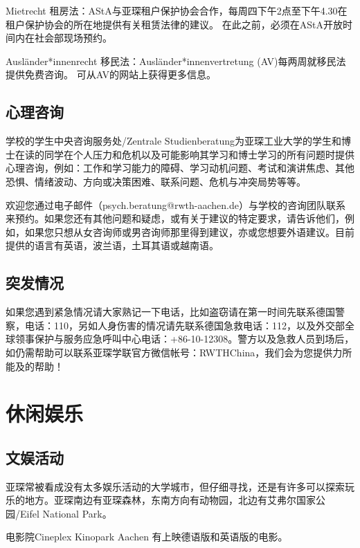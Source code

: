     Mietrecht 租房法：AStA与亚琛租户保护协会合作，每周四下午2点至下午4.30在租户保护协会的所在地提供有关租赁法律的建议。 在此之前，必须在AStA开放时间内在社会部现场预约。

    Ausländer*innenrecht 移民法：Ausländer*innenvertretung (AV)每两周就移民法提供免费咨询。 可从AV的网站上获得更多信息。

  \subsection{心理咨询}\label{subsec:心理咨询}

    学校的学生中央咨询服务处/Zentrale Studienberatung为亚琛工业大学的学生和博士在读的同学在个人压力和危机以及可能影响其学习和博士学习的所有问题时提供心理咨询，例如：工作和学习能力的障碍、学习动机问题、考试和演讲焦虑、其他恐惧、情绪波动、方向或决策困难、联系问题、危机与冲突局势等等。

    欢迎您通过电子邮件（psych.beratung@rwth-aachen.de）与学校的咨询团队联系来预约。如果您还有其他问题和疑虑，或有关于建议的特定要求，请告诉他们，例如，如果您只想从女咨询师或男咨询师那里得到建议，亦或您想要外语建议。目前提供的语言有英语，波兰语，土耳其语或越南语。

  \subsection{突发情况}\label{subsec:突发情况}

    如果您遇到紧急情况请大家熟记一下电话，比如盗窃请在第一时间先联系德国警察，电话：110，另如人身伤害的情况请先联系德国急救电话：112，以及外交部全球领事保护与服务应急呼叫中心电话：+86-10-12308。警方以及急救人员到场后，如仍需帮助可以联系亚琛学联官方微信帐号：RWTHChina，我们会为您提供力所能及的帮助！

\section{休闲娱乐}\label{sec:休闲娱乐}

  \subsection{文娱活动}\label{subsec:文娱活动}

    亚琛常被看成没有太多娱乐活动的大学城市，但仔细寻找，还是有许多可以探索玩乐的地方。亚琛南边有亚琛森林，东南方向有动物园，北边有艾弗尔国家公园/Eifel National Park。

    电影院Cineplex Kinopark Aachen 有上映德语版和英语版的电影。

